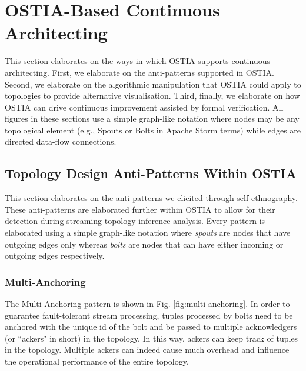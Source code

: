 \section{OSTIA-Based Continuous Architecting}
This section elaborates on the ways in which OSTIA supports continuous architecting. First, we elaborate on the anti-patterns supported in OSTIA. Second,  we elaborate on the algorithmic manipulation that OSTIA could apply to topologies to provide alternative visualisation. Third, finally, we elaborate on how OSTIA can drive continuous improvement assisted by formal verification. All figures in these sections use a simple graph-like notation where nodes may be any topological element (e.g., Spouts or Bolts in Apache Storm terms) while edges are directed data-flow connections.


\subsection{Topology Design Anti-Patterns Within OSTIA}\label{sec:anti-pattern}
This section elaborates on the anti-patterns we elicited through self-ethnography. These anti-patterns are elaborated further within OSTIA to allow for their detection during streaming topology inference analysis. Every pattern is elaborated using a simple graph-like notation where \emph{spouts} are nodes that have outgoing edges only whereas \emph{bolts} are nodes that can have either incoming or outgoing edges respectively.

\subsubsection{Multi-Anchoring}
The Multi-Anchoring pattern is shown in Fig. \ref{fig:multi-anchoring}. In order to guarantee fault-tolerant stream processing, tuples processed by bolts need to be anchored with the unique id of the bolt and be passed to multiple acknowledgers (or ``ackers" in short) in the topology. In this way, ackers can keep track of tuples in the topology. Multiple ackers can indeed cause much overhead and influence the operational performance of the entire topology.


